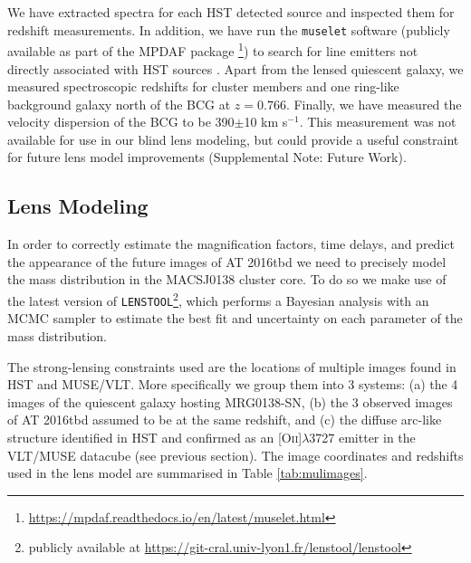 \documentclass[12pt]{article}
\def\SNABC{AT 2016tbd\xspace}
\def\lenstool{{\tt LENSTOOL}\xspace}
\begin{document}
We have extracted spectra for each HST detected source and inspected them for redshift measurements. In addition, we have run the {\tt muselet} software (publicly available as part of the MPDAF package \cite{piqueras_mpdaf_2019}\footnote{\url{https://mpdaf.readthedocs.io/en/latest/muselet.html}}) to search for line emitters not directly associated with HST sources \cite{mahler_strong_2018,lagattuta_probing_2019}. Apart from the lensed quiescent galaxy, we measured spectroscopic redshifts for cluster members and one ring-like background galaxy north of the BCG at $z=0.766$.  Finally, we have measured the velocity dispersion of the BCG to be 390$\pm$10 km s$^{-1}$.  This measurement was not available for use in our blind lens modeling, but could provide a useful constraint for future lens model improvements (Supplemental Note: Future Work).

\subsection*{Lens Modeling}

In order to correctly estimate the magnification factors, time delays, and predict the appearance of the future images of \SNABC we need to precisely model the mass distribution in the MACSJ0138 cluster core. To do so we make use of the latest version of \lenstool \cite{jullo_bayesian_2007}\footnote{publicly available at \url{ https://git-cral.univ-lyon1.fr/lenstool/lenstool}}, which performs a Bayesian analysis with an MCMC sampler to estimate the best fit and uncertainty on each parameter of the mass distribution. 

The strong-lensing constraints used are the locations of multiple images found in HST and MUSE/VLT. More specifically we group them into 3 systems: (a) the 4 images of the quiescent galaxy hosting MRG0138-SN, (b) the 3 observed images of \SNABC assumed to be at the same redshift, and (c) the diffuse arc-like structure identified in HST and confirmed as an [O\textsc{ii}]$\lambda$3727 emitter in the VLT/MUSE datacube (see previous section). The image coordinates and redshifts used in the lens model are summarised in Table \ref{tab:mulimages}.
\end{document}
